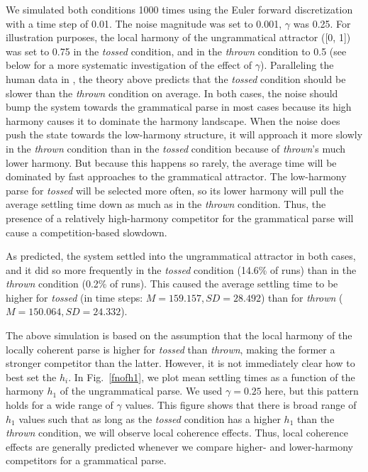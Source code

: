 \documentclass[10pt,letterpaper]{article}
\begin{document}
We simulated both conditions 1000 times using the Euler forward discretization with a time step of 0.01. The noise magnitude was set to 0.001, $\gamma$ was 0.25. For illustration purposes, the local harmony of the ungrammatical attractor ([0, 1]) was set to 0.75 in the \emph{tossed} condition, and in the \emph{thrown} condition to 0.5 (see below for a more systematic investigation of the effect of $\gamma$). Paralleling the human data in , the theory above predicts that the \emph{tossed} condition should be slower than the \emph{thrown} condition on average. In both cases, the noise should bump the system towards the grammatical parse in most cases because its high harmony causes it to dominate the harmony landscape. When the noise does push the state towards the low-harmony structure, it will approach it more slowly in the \emph{thrown} condition than in the \emph{tossed} condition because of \emph{thrown}'s much lower harmony. But because this happens so rarely, the average time will be dominated by fast approaches to the grammatical attractor. The low-harmony parse for \emph{tossed} will be selected more often, so its lower harmony will pull the average settling time down as much as in the \emph{thrown} condition. Thus, the presence of a relatively high-harmony competitor for the grammatical parse will cause a competition-based slowdown.

As predicted, the system settled into the ungrammatical attractor in both cases, and it did so more frequently in the \emph{tossed} condition (14.6\% of runs) than in the \emph{thrown} condition (0.2\% of runs). This caused the average settling time to be higher for \emph{tossed} (in time steps: $M = 159.157, SD = 28.492$) than for \emph{thrown} ($M = 150.064, SD = 24.332$).

The above simulation is based on the assumption that the local harmony of the locally coherent parse is higher for \emph{tossed} than \emph{thrown}, making the former a stronger competitor than the latter. However, it is not immediately clear how to best set the $h_i$. In Fig.~\ref{fnofh1}, we plot mean settling times as a function of the harmony $h_1$ of the ungrammatical parse. We used $\gamma = 0.25$ here, but this pattern holds for a wide range of $\gamma$ values. This figure shows that there is broad range of $h_1$ values such that as long as the \emph{tossed} condition has a higher $h_1$ than the \emph{thrown} condition, we will observe local coherence effects. Thus, local coherence effects are generally predicted whenever we compare higher- and lower-harmony competitors for a grammatical parse.
\end{document}
